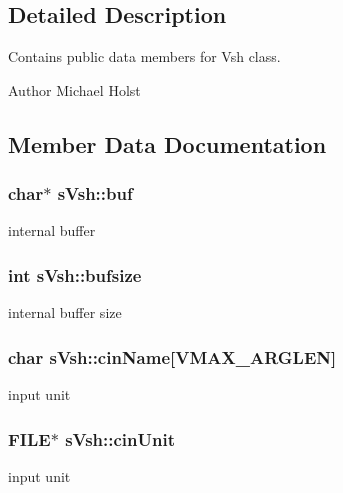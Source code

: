 \subsection{Detailed Description}
Contains public data members for Vsh class. 

\begin{DoxyAuthor}{Author}
Michael Holst 
\end{DoxyAuthor}


\subsection{Member Data Documentation}
\subsubsection[{buf}]{\setlength{\rightskip}{0pt plus 5cm}char$\ast$ s\+Vsh\+::buf}\label{a00007_a54d6581a859ce3e568994a2acb34eeca}


internal buffer 

\subsubsection[{bufsize}]{\setlength{\rightskip}{0pt plus 5cm}int s\+Vsh\+::bufsize}\label{a00007_a3178ea2c169d30c7de2db923c6fc1472}


internal buffer size 

\subsubsection[{cin\+Name}]{\setlength{\rightskip}{0pt plus 5cm}char s\+Vsh\+::cin\+Name[{\bf V\+M\+A\+X\+\_\+\+A\+R\+G\+L\+E\+N}]}\label{a00007_a4f656d4cfedad44dfa387f941aaf1f70}


input unit 

\subsubsection[{cin\+Unit}]{\setlength{\rightskip}{0pt plus 5cm}F\+I\+L\+E$\ast$ s\+Vsh\+::cin\+Unit}\label{a00007_aafb169c1a906339713936d6434f1aab2}


input unit 

